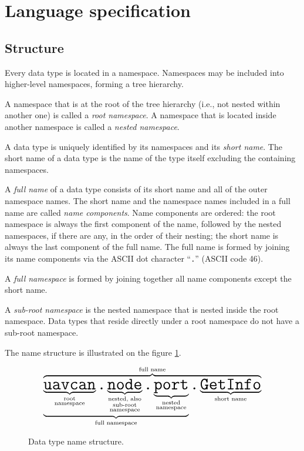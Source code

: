 \section{Language specification}

\subsection{Structure}

Every data type is located in a namespace.
Namespaces may be included into higher-level namespaces, forming a tree hierarchy.

A namespace that is at the root of the tree hierarchy (i.e., not nested within another one)
is called a \emph{root namespace}.
A namespace that is located inside another namespace is called a \emph{nested namespace}.

A data type is uniquely identified by its namespaces and its \emph{short name}.
The short name of a data type is the name of the type itself excluding the containing namespaces.

A \emph{full name} of a data type consists of its short name and all of the outer namespace names.
The short name and the namespace names included in a full name are called \emph{name components}.
Name components are ordered: the root namespace is always the first component of the name,
followed by the nested namespaces, if there are any, in the order of their nesting;
the short name is always the last component of the full name.
The full name is formed by joining its name components via the ASCII dot character ``\verb|.|'' (ASCII code 46).

A \emph{full namespace} is formed by joining together all name components except the short name.

A \emph{sub-root namespace} is the nested namespace that is nested inside the root namespace.
Data types that reside directly under a root namespace do not have a sub-root namespace.

The name structure is illustrated on the figure \ref{fig:dsdl_data_type_name_structure}.

\begin{figure}[H]
    $$
    \overbrace{
        \underbrace{
            \underbrace{\texttt{\huge{uavcan}}}_{\substack{\text{root} \\ \text{namespace}}}%
            \texttt{\huge{.}}%
            \underbrace{\texttt{\huge{node}}}_{\substack{\text{nested, also} \\ \text{sub-root} \\ \text{namespace}}}%
            \texttt{\huge{.}}%
            \underbrace{\texttt{\huge{port}}}_{\substack{\text{nested} \\ \text{namespace}}}%
        }_{\text{full namespace}}%
        \texttt{\huge{.}}%
        \underbrace{\texttt{\huge{GetInfo}}}_{\text{short name}}
    }^{\text{full name}}
    $$
    \caption{Data type name structure.\label{fig:dsdl_data_type_name_structure}}
\end{figure}

